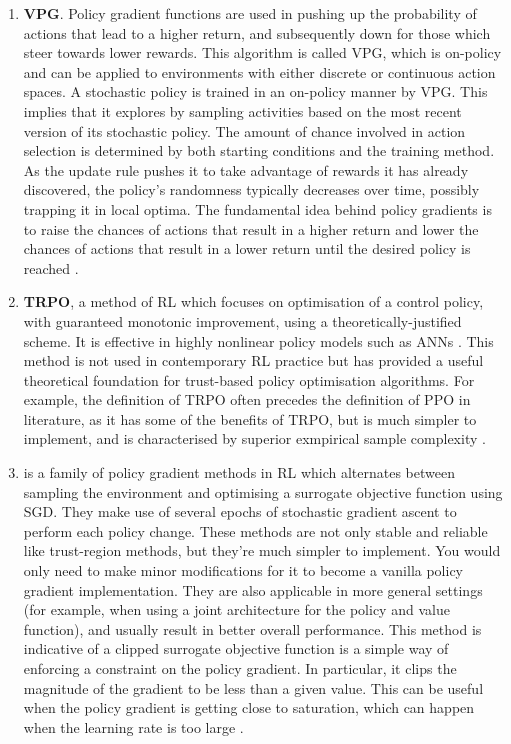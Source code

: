 \begin{enumerate}

    \item \textbf{\Gls{VPG}}. Policy gradient functions are used in pushing up the probability of actions that lead to a higher return, and subsequently down for those which steer towards lower rewards. This algorithm is called \gls{VPG}, which is on-policy and can be applied to environments with either discrete or continuous action spaces. A stochastic policy is trained in an on-policy manner by \gls{VPG}. This implies that it explores by sampling activities based on the most recent version of its stochastic policy. The amount of chance involved in action selection is determined by both starting conditions and the training method. As the update rule pushes it to take advantage of rewards it has already discovered, the policy's randomness typically decreases over time, possibly trapping it in local optima. The fundamental idea behind policy gradients is to raise the chances of actions that result in a higher return and lower the chances of actions that result in a lower return until the desired policy is reached \cite{Sutton1998, Sutton2000}.

    \item \textbf{\Gls{TRPO}}, a method of \gls{RL} which focuses on optimisation of a control policy, with guaranteed monotonic improvement, using a theoretically-justified scheme. It is effective in highly nonlinear policy models such as \glspl{ANN} \cite{Schulman2015}. This method is not used in contemporary \gls{RL} practice but has provided a useful theoretical foundation for trust-based policy optimisation algorithms. For example, the definition of \gls{TRPO} often precedes the definition of \gls{PPO} in literature, as it has some of the benefits of \gls{TRPO}, but is much simpler to implement, and is characterised by superior exmpirical sample complexity \cite{Schulman2017}.
    
    \item \textbf{} is a family of policy gradient methods in \gls{RL} which alternates between sampling the environment and optimising a surrogate objective function using \gls{SGD}. They make use of several epochs of stochastic gradient ascent to perform each policy change. These methods are not only stable and reliable like trust-region methods, but they're much simpler to implement. You would only need to make minor modifications for it to become a vanilla policy gradient implementation. They are also applicable in more general settings (for example, when using a joint architecture for the policy and value function), and usually result in better overall performance. This method is indicative of a clipped surrogate objective function is a simple way of enforcing a constraint on the policy gradient. In particular, it clips the magnitude of the gradient to be less than a given value. This can be useful when the policy gradient is getting close to saturation, which can happen when the learning rate is too large \cite{Schulman2017}. 


\end{enumerate}
